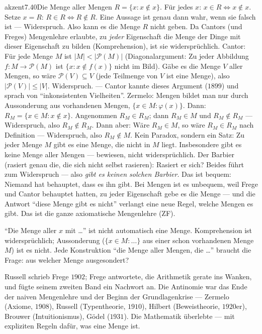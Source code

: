 \begin{loesungkarte}{akzent}{7.40}{Die Menge aller Mengen}
$R = \{x\colon x\notin x\}$. Für jedes $x$: $x\in R\iff x\notin x$. Setze $x = R$: $R\in R\iff R\notin R$. Eine Aussage ist genau dann wahr, wenn sie falsch ist --- Widerspruch. Also kann es die Menge $R$ nicht geben. Da Cantors (und Freges) Mengenlehre erlaubte, zu \emph{jeder} Eigenschaft die Menge der Dinge mit dieser Eigenschaft zu bilden (Komprehension), ist sie widersprüchlich.
Cantor: Für jede Menge $M$ ist $|M| < |\mathcal P(M)|$ (Diagonalargument: Zu jeder Abbildung $f\colon M\to\mathcal P(M)$ ist $\{x\colon x\notin f(x)\}$ nicht im Bild). Gäbe es die Menge $V$ aller Mengen, so wäre $\mathcal P(V)\subseteq V$ (jede Teilmenge von $V$ ist eine Menge), also $|\mathcal P(V)|\le|V|$. Widerspruch. --- Cantor kannte dieses Argument ($1899$) und sprach von \enquote{inkonsistenten Vielheiten}.
Zermelo: Mengen bildet man nur durch Aussonderung aus vorhandenen Mengen, $\{x\in M\colon\varphi(x)\}$. Dann: $R_M = \{x\in M\colon x\notin x\}$. Angenommen $R_M\in R_M$; dann $R_M\in M$ und $R_M\notin R_M$ --- Widerspruch, also $R_M\notin R_M$. Dann aber: Wäre $R_M\in M$, so wäre $R_M\in R_M$ nach Definition --- Widerspruch, also $R_M\notin M$. Kein Paradox, sondern ein Satz: Zu jeder Menge $M$ gibt es eine Menge, die nicht in $M$ liegt. Insbesondere gibt es keine Menge aller Mengen --- bewiesen, nicht widersprüchlich.
Der Barbier (rasiert genau die, die sich nicht selbst rasieren): Rasiert er sich? Beides führt zum Widerspruch --- also \emph{gibt es keinen solchen Barbier}. Das ist bequem: Niemand hat behauptet, dass es ihn gibt. Bei Mengen ist es unbequem, weil Frege und Cantor behauptet hatten, zu jeder Eigenschaft gebe es die Menge --- und die Antwort \enquote{diese Menge gibt es nicht} verlangt eine neue Regel, welche Mengen es gibt. Das ist die ganze axiomatische Mengenlehre (ZF).
\begin{fehler}\kastentext
\enquote{Die Menge aller $x$ mit \dots} ist nicht automatisch eine Menge. Komprehension ist widersprüchlich; Aussonderung ($\{x\in M\colon\dots\}$ aus einer schon vorhandenen Menge $M$) ist es nicht. Jede Konstruktion \enquote{die Menge aller Mengen, die \dots} braucht die Frage: aus welcher Menge ausgesondert?
\end{fehler}
\begin{mitnehmen}\kastentext
Russell schrieb Frege $1902$; Frege antwortete, die Arithmetik gerate ins Wanken, und fügte seinem zweiten Band ein Nachwort an. Die Antinomie war das Ende der naiven Mengenlehre und der Beginn der Grundlagenkrise --- Zermelo (Axiome, $1908$), Russell (Typentheorie, $1910$), Hilbert (Beweistheorie, $1920$er), Brouwer (Intuitionismus), Gödel ($1931$). Die Mathematik überlebte --- mit expliziten Regeln dafür, was eine Menge ist.
\end{mitnehmen}
\end{loesungkarte}
